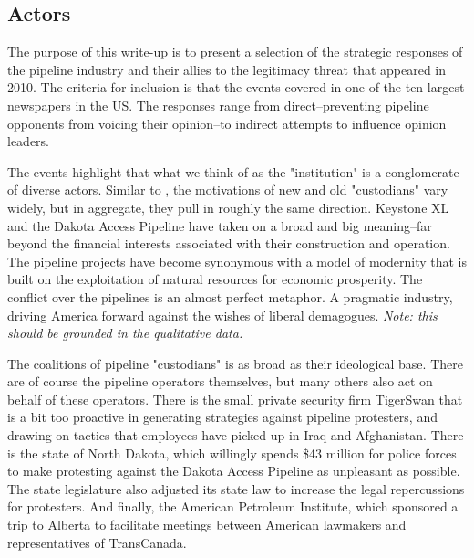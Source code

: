 
\subsection*{Actors}

The purpose of this write-up is to present a selection of the strategic responses of the pipeline industry and their allies to the legitimacy threat that appeared in 2010. The criteria for inclusion is that the events covered in one of the ten largest newspapers in the US. The responses range from direct--preventing pipeline opponents from voicing their opinion--to indirect attempts to influence opinion leaders.

The events highlight that what we think of as the "institution" is a conglomerate of diverse actors. Similar to \citet{Montgomery2020b}, the motivations of new and old "custodians" vary widely, but in aggregate, they pull in roughly the same direction. Keystone XL and the Dakota Access Pipeline have taken on a broad and big meaning--far beyond the financial interests associated with their construction and operation. The pipeline projects have become synonymous with a model of modernity that is built on the exploitation of natural resources for economic prosperity. The conflict over the pipelines is an almost perfect metaphor. A pragmatic industry, driving America forward against the wishes of liberal demagogues. \textit{Note: this should be grounded in the qualitative data.}

The coalitions of pipeline "custodians" is as broad as their ideological base. There are of course the pipeline operators themselves, but many others also act on behalf of these operators. 
There is the small private security firm TigerSwan that is a bit too proactive in generating strategies against pipeline protesters, and drawing on tactics that employees have picked up in Iraq and Afghanistan. 
There is the state of North Dakota, which willingly spends \$43 million for police forces to make protesting against the Dakota Access Pipeline as unpleasant as possible. The state legislature also adjusted its state law to increase the legal repercussions for protesters. And finally, the American Petroleum Institute, which sponsored a trip to Alberta to facilitate meetings between American lawmakers and representatives of TransCanada.
